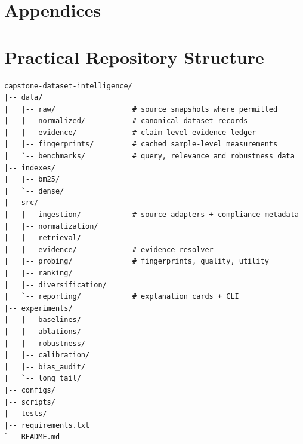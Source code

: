 \documentclass[11pt]{article}
\begin{document}
\newpage
\appendix
\section*{Appendices}

\section{Practical Repository Structure}
\begin{lstlisting}[basicstyle=\ttfamily\footnotesize]
capstone-dataset-intelligence/
|-- data/
|   |-- raw/                  # source snapshots where permitted
|   |-- normalized/           # canonical dataset records
|   |-- evidence/             # claim-level evidence ledger
|   |-- fingerprints/         # cached sample-level measurements
|   `-- benchmarks/           # query, relevance and robustness data
|-- indexes/
|   |-- bm25/
|   `-- dense/
|-- src/
|   |-- ingestion/            # source adapters + compliance metadata
|   |-- normalization/
|   |-- retrieval/
|   |-- evidence/             # evidence resolver
|   |-- probing/              # fingerprints, quality, utility
|   |-- ranking/
|   |-- diversification/
|   `-- reporting/            # explanation cards + CLI
|-- experiments/
|   |-- baselines/
|   |-- ablations/
|   |-- robustness/
|   |-- calibration/
|   |-- bias_audit/
|   `-- long_tail/
|-- configs/
|-- scripts/
|-- tests/
|-- requirements.txt
`-- README.md
\end{lstlisting}

\end{document}
